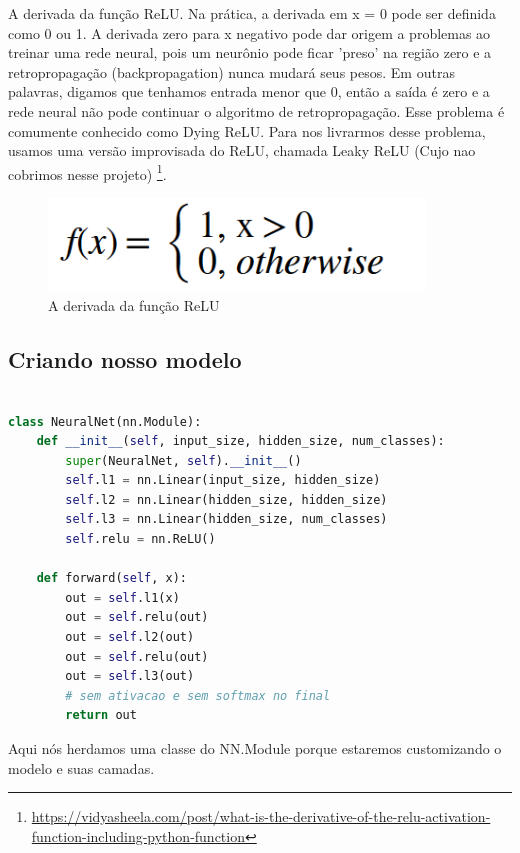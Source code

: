 A derivada da função ReLU. Na prática, a derivada em x = 0 pode ser definida como 0 ou 1.
A derivada zero para x negativo pode dar origem a problemas ao treinar uma rede neural,
pois um neurônio pode ficar 'preso' na região zero e a retropropagação (backpropagation) nunca mudará seus pesos.
Em outras palavras, digamos que tenhamos entrada menor que 0, então a saída é zero e a rede neural não pode continuar o algoritmo de retropropagação. Esse problema é comumente conhecido como Dying ReLU. Para nos livrarmos desse problema, usamos uma versão improvisada do ReLU, chamada Leaky ReLU (Cujo nao cobrimos nesse projeto) \footnote{\url{https://vidyasheela.com/post/what-is-the-derivative-of-the-relu-activation-function-including-python-function}}.

\begin{figure}[H]
   \begin{center}
      \includegraphics[width=10cm]{img/relu3.png}
      \caption{A derivada da função ReLU} \label{relu3}
   \end{center}
\end{figure}


\subsection[Criando nosso modelo]{Criando nosso modelo}

\begin{lstlisting}[language=Python, caption=Modelo]

class NeuralNet(nn.Module):
    def __init__(self, input_size, hidden_size, num_classes):
        super(NeuralNet, self).__init__()
        self.l1 = nn.Linear(input_size, hidden_size)
        self.l2 = nn.Linear(hidden_size, hidden_size)
        self.l3 = nn.Linear(hidden_size, num_classes)
        self.relu = nn.ReLU()

    def forward(self, x):
        out = self.l1(x)
        out = self.relu(out)
        out = self.l2(out)
        out = self.relu(out)
        out = self.l3(out)
        # sem ativacao e sem softmax no final
        return out

\end{lstlisting}

Aqui nós herdamos uma classe do NN.Module porque estaremos customizando o modelo e suas camadas.


